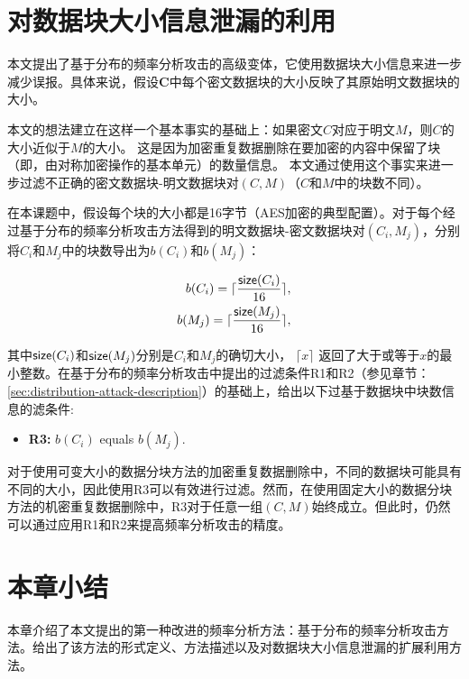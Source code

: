 \section{对数据块大小信息泄漏的利用}

本文提出了基于分布的频率分析攻击的高级变体，它使用数据块大小信息来进一步减少误报。具体来说，假设$\mathbf{C}$中每个密文数据块的大小反映了其原始明文数据块的大小。 

本文的想法建立在这样一个基本事实的基础上：如果密文$C$对应于明文$M$，则$C$的大小近似于$M$的大小。 这是因为加密重复数据删除在要加密的内容中保留了块（即，由对称加密操作的基本单元）的数量信息。 本文通过使用这个事实来进一步过滤不正确的密文数据块-明文数据块对$(C,M)$（$C$和$M$中的块数不同）。

在本课题中，假设每个块的大小都是16字节（AES加密的典型配置）。对于每个经过基于分布的频率分析攻击方法得到的明文数据块-密文数据块对$(C_i, M_j)$，分别将$C_i$和$M_j$中的块数导出为$b({C_i})$和$b({M_j})$：

\begin{equation}
\begin{aligned}
\label{eq:b-dis}
b({C_i}) = \lceil \frac{{\sf size}(C_i)}{16} \rceil,  \\
b({M_j}) = \lceil \frac{{\sf size}(M_j)}{16} \rceil, 
\end{aligned}
\end{equation}

其中${\sf size}(C_i)$和${\sf size}(M_j)$分别是$C_i$和$M_j$的确切大小， $\lceil x \rceil$ 返回了大于或等于$x$的最小整数。在基于分布的频率分析攻击中提出的过滤条件R1和R2（参见章节：\ref{sec:distribution-attack-description}）的基础上，给出以下过基于数据块中块数信息的滤条件:  
 
\begin{itemize}[leftmargin=*]
    \item {\bf R3:} $b({C_i})$ equals $b({M_j})$.
\end{itemize}

对于使用可变大小的数据分块方法的加密重复数据删除中，不同的数据块可能具有不同的大小，因此使用R3可以有效进行过滤。然而，在使用固定大小的数据分块方法的机密重复数据删除中，R3对于任意一组$(C, M)$始终成立。但此时，仍然可以通过应用R1和R2来提高频率分析攻击的精度。
     

\section{本章小结}

本章介绍了本文提出的第一种改进的频率分析方法：基于分布的频率分析攻击方法。给出了该方法的形式定义、方法描述以及对数据块大小信息泄漏的扩展利用方法。                  



